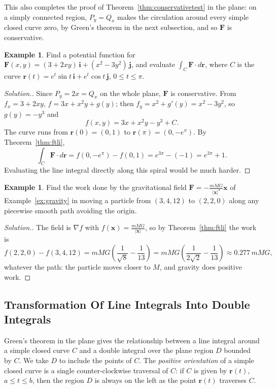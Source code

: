 \documentclass[11pt,a4paper]{article}
\theoremstyle{definition}
\newtheorem{exa}[thm]{Example}
\newenvironment{solution}
  {\renewcommand{\qedsymbol}{}\begin{proof}[\textit{Solution}.]}
  {\end{proof}}
\begin{document}
This also completes the proof of Theorem~\ref{thm:conservativetest} in the
plane: on a simply connected region, $P_y = Q_x$ makes the circulation around
every simple closed curve zero, by Green's theorem in the next subsection, and
so $\mathbf F$ is conservative.

\begin{exa}
\label{ex:ftlipotential}
Find a potential function for $\mathbf F(x,y) = (3 + 2xy)\,\mathbf i + (x^2 -
3y^2)\,\mathbf j$, and evaluate $\int_C \mathbf F\cdot d\mathbf r$, where $C$ is
the curve $\mathbf r(t) = e^t \sin t \,\mathbf i + e^t \cos t \,\mathbf j$,
$0 \leq t \leq \pi$.
\end{exa}

\begin{solution}
Since $P_y = 2x = Q_x$ on the whole plane, $\mathbf F$ is conservative. From
$f_x = 3 + 2xy$, $f = 3x + x^2y + g(y)$; then $f_y = x^2 + g'(y) = x^2 - 3y^2$,
so $g(y) = -y^3$ and
\[f(x,y) = 3x + x^2y - y^3 + C .\]
The curve runs from $\mathbf r(0) = (0,1)$ to $\mathbf r(\pi) = (0,-e^{\pi})$.
By Theorem~\ref{thm:ftli},
\[\int_C \mathbf F\cdot d\mathbf r = f(0, -e^{\pi}) - f(0,1) = e^{3\pi} - (-1) =
e^{3\pi} + 1 .\]
Evaluating the line integral directly along this spiral would be much harder.
\end{solution}

\begin{exa}
\label{ex:ftli3}
Find the work done by the gravitational field
$\mathbf F = -\frac{mMG}{|\mathbf x|^3}\mathbf x$ of Example~\ref{ex:gravity} in
moving a particle from $(3,4,12)$ to $(2,2,0)$ along any piecewise smooth path
avoiding the origin.
\end{exa}

\begin{solution}
The field is $\nabla f$ with $f(\mathbf x) = \frac{mMG}{|\mathbf x|}$, so by
Theorem~\ref{thm:ftli} the work is
\[f(2,2,0) - f(3,4,12) = mMG\left(\frac{1}{\sqrt8} - \frac{1}{13}\right) =
mMG\left(\frac{1}{2\sqrt2} - \frac1{13}\right)\approx 0.277\,mMG ,\]
whatever the path: the particle moves closer to $M$, and gravity does positive
work.
\end{solution}

{\color[wave]{485}\subsection{Transformation Of Line Integrals Into Double Integrals}}

Green's theorem in the plane gives the relationship between a line integral
around a simple closed curve $C$ and a double integral over the plane region $D$
bounded by $C$. We take $D$ to include the points of $C$. The \emph{positive
orientation} of a simple closed curve is a single counter-clockwise traversal of
$C$: if $C$ is given by $\mathbf r(t)$, $a\leq t \leq b$, then the region $D$ is
always on the left as the point $\mathbf r(t)$ traverses $C$.
\end{document}

